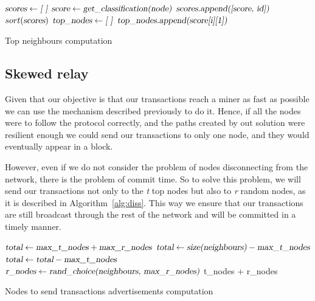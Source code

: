 \documentclass{dads}   %
\begin{document}
\begin{algorithm}[t]
\begin{algorithmic}[1]
\State $\textsl{scores} \gets \textsl{[ ]}$
  \State $\textsl{score} \gets \textsl{get\_classification(node)}$
  \State $\textsl{scores.append([score, id])}$
\EndFor
\State $sort(\textsl{scores})$
\State $\textsl{top\_nodes} \gets \textsl{[ ]}$
  \State $\textsl{top\_nodes.append(score[i][1])}$
\EndFor
\EndFunction
\end{algorithmic}
\caption{Top neighbours computation}
\label{alg:class}
\end{algorithm}
\subsection{Skewed relay}
\label{sec:sr}
Given that our objective is that our transactions reach a miner as fast as possible we can use the mechanism described previously to do it. Hence, if all the nodes were to follow the protocol correctly, and the paths created by out solution were resilient enough we could send our transactions to only one node, and they would eventually appear in a block.

However, even if we do not consider the problem of nodes disconnecting from the network, there is the problem of commit time. So to solve this problem, we will send our transactions not only to the \textit{t} top nodes but also to \textit{r} random nodes, as it is described in Algorithm~\ref{alg:diss}. This way we ensure that our transactions are still broadcast through the rest of the network and will be committed in a timely manner.

\begin{algorithm}[t]
\begin{algorithmic}[1]
\EndIf
\State $\textsl{total} \gets \textsl{max\_t\_nodes} + \textsl{max\_r\_nodes}$
	\State $\textsl{total} \gets \textsl{size(neighbours)} - \textsl{max\_t\_nodes}$
\Else
	\State $\textsl{total} \gets \textsl{total} - \textsl{max\_t\_nodes}$
    \EndIf
{}
	\State $\textsl{r\_nodes} \gets \textsl{rand\_choice(neighbours, max\_r\_nodes)}$
    \EndIf
\State \Return t\_nodes + r\_nodes
\EndFunction
\end{algorithmic}
\caption{Nodes to send transactions advertisements computation}
\label{alg:diss}
\end{algorithm}
\end{document}
